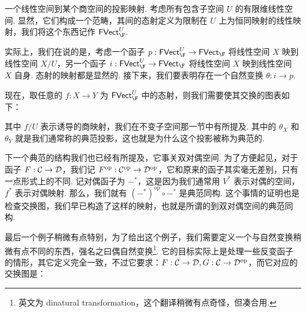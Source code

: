 \begin{example}{}{}
    一个线性空间到某个商空间的投影映射. 考虑所有包含子空间 $U$ 的有限维线性空间. 显然，它们构成一个范畴，其间的态射定义为限制在 $U$ 上为恒同映射的线性映射，我们将这个东西记作 $\FVect_\F^U$.

    实际上，我们在说的是，考虑一个函子 $p: \FVect_\F^U \to \FVect_\F$ 将线性空间 $X$ 映到线性空间 $X/U$，另一个函子 $i: \FVect_\F^U \to \FVect_\F$ 将线性空间 $X$ 映到线性空间 $X$ 自身. 态射的映射都是显然的. 接下来，我们要表明存在一个自然变换 $\theta: i \to p$.

    现在，取任意的 $f: X \to Y$ 为 $\FVect_\F^U$ 中的态射，则我们需要使其交换的图表如下：

    \begin{center}
    \end{center}

    其中 $f/U$ 表示诱导的商映射，我们在不变子空间那一节中有所提及. 其中的 $\theta_X$ 和 $\theta_Y$ 就是我们通常称的典范投影，这也就是为什么这个投影被称为典范的.
\end{example}

下一个典范的结构我们也已经有所提及，它事关双对偶空间. 为了方便起见，对于函子 $F: \mathcal{C} \to \mathcal{D}$，我们记 $F^\mathrm{op}: \mathcal{C}^\mathrm{op} \to \mathcal{D}^\mathrm{op}$，它和原来的函子其实毫无差别，只有一点形式上的不同. 记对偶函子为 $-^*$，这是因为我们通常用 $V^*$ 表示对偶的空间，$f^*$ 表示对偶映射. 那么，我们就有 $(-^*)^\mathrm{op} \circ -^*$ 是典范同构. 这个事情的证明也是检查交换图，我们早已构造了这样的映射，也就是所谓的到双对偶空间的典范同构.

最后一个例子稍微有点特别，为了给出这个例子，我们需要定义一个与自然变换稍微有点不同的东西，强名之曰偶自然变换\footnote{英文为 dinatural transformation，这个翻译稍微有点奇怪，但凑合用. }. 它的目标实际上是处理一些反变函子的情形，其它定义完全一致，不过它要求：$F: \mathcal{C} \to \mathcal{D}, G: \mathcal{C} \to \mathcal{D}^\mathrm{op}$，而它对应的交换图是：

\begin{center}
\end{center}

